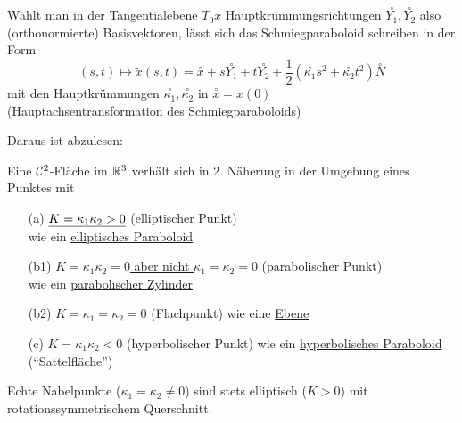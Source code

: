 \begin{folgerung}
 Wählt man in der Tangentialebene \(T_0x\) Hauptkrümmungsrichtungen \(\stackrel \circ {Y_1}, \stackrel \circ{Y_2}\) also (orthonormierte) Basisvektoren, lässt sich das Schmiegparaboloid schreiben in der Form
 \[
  (s,t) \mapsto \widetilde x(s,t) = \stackrel \circ x + s \stackrel \circ {Y_1} + t \stackrel \circ {Y_2} + \frac12 \left( \stackrel \circ {\kappa_1}s^2 + \stackrel \circ {\kappa_2} t^2 \right) \stackrel \circ N
 \]
 mit den Hauptkrümmungen \(\stackrel \circ {\kappa_1}, \stackrel \circ {\kappa_2}\) in \(\stackrel \circ x = x(0)\) \\(Hauptachsentransformation des Schmiegparaboloids) \\
 \big[ ``\(z = \frac12 \left( \stackrel \circ {\kappa_1} x^2 + \stackrel \circ {\kappa_2} y^2 \right)\)'' \big]
\end{folgerung}

Daraus ist abzulesen:

\begin{satz}\label{satz234}
 Eine \(\mathcal{C}^2\)-Fläche im \(\mathbb{R}^3\) verhält sich in 2. Näherung in der Umgebung eines Punktes mit 
 \begin{enumerate}
  \item[(a)] \(\uline{K = \kappa_1 \kappa_2 > 0}\) (elliptischer Punkt) \\
  wie ein \uline{elliptisches Paraboloid}  
  \item[(b1)] \uline{\(K = \kappa_1 \kappa_2 = 0\) aber nicht \(\kappa_1 = \kappa_2 = 0\)} (parabolischer Punkt) \\
  wie ein \uline{parabolischer Zylinder}
  \item[(b2)] \uline{\(K = \kappa_1 = \kappa_2 = 0\)} (Flachpunkt)
  wie eine \uline{Ebene}
  \item[(c)] \uline{\(K = \kappa_1 \kappa_2 < 0\)} (hyperbolischer Punkt)
  wie ein \uline{hyperbolisches Paraboloid} (``Sattelfläche'')
 \end{enumerate}
\end{satz}

\begin{bemerkung}
 Echte Nabelpunkte (\(\kappa_1 = \kappa_2 \ne 0\)) sind stets elliptisch (\(K > 0\)) mit rotationssymmetrischem Querschnitt.
\end{bemerkung}

